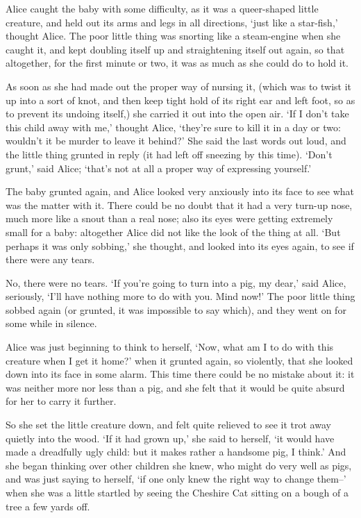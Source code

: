 \documentclass[statementpaper,twoside,openany]{memoir}
\begin{document}
Alice caught the baby with some difficulty, as it was a queer-shaped little creature, and held out its arms and legs in all directions, `just like a star-fish,' thought Alice. The poor little thing was snorting like a steam-engine when she caught it, and kept doubling itself up and straightening itself out again, so that altogether, for the first minute or two, it was as much as she could do to hold it.

As soon as she had made out the proper way of nursing it, (which was to twist it up into a sort of knot, and then keep tight hold of its right ear and left foot, so as to prevent its undoing itself,) she carried it out into the open air. `If I don't take this child away with me,' thought Alice, `they're sure to kill it in a day or two: wouldn't it be murder to leave it behind?' She said the last words out loud, and the little thing grunted in reply (it had left off sneezing by this time). `Don't grunt,' said Alice; `that's not at all a proper way of expressing yourself.'

The baby grunted again, and Alice looked very anxiously into its face to see what was the matter with it. There could be no doubt that it had a very turn-up nose, much more like a snout than a real nose; also its eyes were getting extremely small for a baby: altogether Alice did not like the look of the thing at all. `But perhaps it was only sobbing,' she thought, and looked into its eyes again, to see if there were any tears.

No, there were no tears. `If you're going to turn into a pig, my dear,' said Alice, seriously, `I'll have nothing more to do with you. Mind now!' The poor little thing sobbed again (or grunted, it was impossible to say which), and they went on for some while in silence.

Alice was just beginning to think to herself, `Now, what am I to do with this creature when I get it home?' when it grunted again, so violently, that she looked down into its face in some alarm. This time there could be no mistake about it: it was neither more nor less than a pig, and she felt that it would be quite absurd for her to carry it further.

So she set the little creature down, and felt quite relieved to see it trot away quietly into the wood. `If it had grown up,' she said to herself, `it would have made a dreadfully ugly child: but it makes rather a handsome pig, I think.' And she began thinking over other children she knew, who might do very well as pigs, and was just saying to herself, `if one only knew the right way to change them--' when she was a little startled by seeing the Cheshire Cat sitting on a bough of a tree a few yards off.
\end{document}
